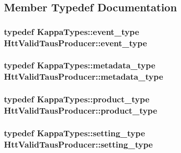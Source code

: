 \subsection{Member Typedef Documentation}
\hypertarget{classHttValidTausProducer_a3e20ad88591457e5cf707cf5992172ef}{
\subsubsection[{event\_\-type}]{\setlength{\rightskip}{0pt plus 5cm}typedef KappaTypes::event\_\-type {\bf HttValidTausProducer::event\_\-type}}}
\label{classHttValidTausProducer_a3e20ad88591457e5cf707cf5992172ef}
\hypertarget{classHttValidTausProducer_a6802826faf081861b7b2f89a8331a4a2}{
\subsubsection[{metadata\_\-type}]{\setlength{\rightskip}{0pt plus 5cm}typedef KappaTypes::metadata\_\-type {\bf HttValidTausProducer::metadata\_\-type}}}
\label{classHttValidTausProducer_a6802826faf081861b7b2f89a8331a4a2}
\hypertarget{classHttValidTausProducer_a2a44fcab8ebc0f3bf907f4afcaaf3406}{
\subsubsection[{product\_\-type}]{\setlength{\rightskip}{0pt plus 5cm}typedef KappaTypes::product\_\-type {\bf HttValidTausProducer::product\_\-type}}}
\label{classHttValidTausProducer_a2a44fcab8ebc0f3bf907f4afcaaf3406}
\hypertarget{classHttValidTausProducer_a3c2e1acc4286eebbcdd76620d3f1fea7}{
\subsubsection[{setting\_\-type}]{\setlength{\rightskip}{0pt plus 5cm}typedef KappaTypes::setting\_\-type {\bf HttValidTausProducer::setting\_\-type}}}
